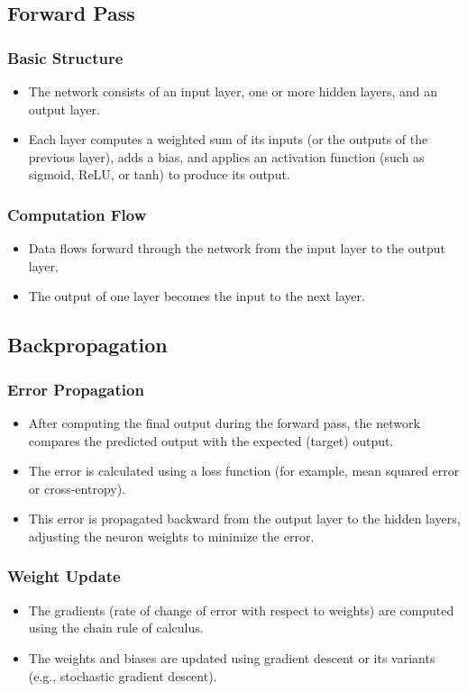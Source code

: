\documentclass[11pt]{article}
\begin{document}
\subsection{Forward Pass}
\subsubsection*{Basic Structure}
\begin{itemize}
    \item The network consists of an input layer, one or more hidden layers, and an output layer.
    \item Each layer computes a weighted sum of its inputs (or the outputs of the previous layer), adds a bias, and applies an activation function (such as sigmoid, ReLU, or tanh) to produce its output.
\end{itemize}

\subsubsection*{Computation Flow}
\begin{itemize}
    \item Data flows forward through the network from the input layer to the output layer.
    \item The output of one layer becomes the input to the next layer.
\end{itemize}

\subsection{Backpropagation}
\subsubsection*{Error Propagation}
\begin{itemize}
    \item After computing the final output during the forward pass, the network compares the predicted output with the expected (target) output.
    \item The error is calculated using a loss function (for example, mean squared error or cross-entropy).
    \item This error is propagated backward from the output layer to the hidden layers, adjusting the neuron weights to minimize the error.
\end{itemize}

\subsubsection*{Weight Update}
\begin{itemize}
    \item The gradients (rate of change of error with respect to weights) are computed using the chain rule of calculus.
    \item The weights and biases are updated using gradient descent or its variants (e.g., stochastic gradient descent).
\end{itemize}
\end{document}
